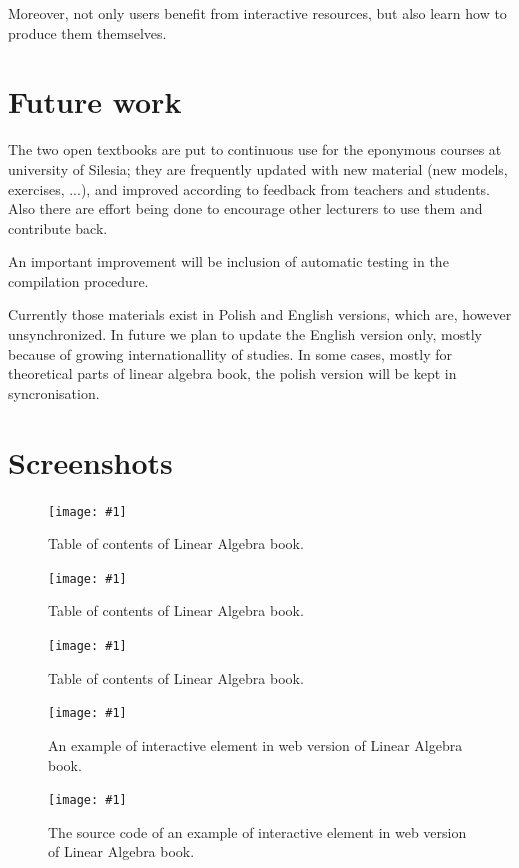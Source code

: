 \documentclass{deliverablereport}
\newcommand{\screenshot}[2]{
\begin{figure}[ht]
  \texttt{[image: \#1]}
  \caption{#2}
  \label{#1}
\end{figure}}
\newcommand{\screenshotsmall}[2]{
\begin{figure}[ht]
  \texttt{[image: \#1]}
  \caption{#2}
  \label{#1}
\end{figure}}
\begin{document}
Moreover, not only users benefit from interactive resources, but also
learn how to produce them themselves.

\section{Future work}


The two open textbooks are put to continuous use for the eponymous
courses at university of Silesia; they are frequently updated with new
material (new models, exercises, ...), and improved according to
feedback from teachers and students. Also there are effort being done
to encourage other lecturers to use them and contribute back.

An important improvement will be inclusion of automatic testing in
the compilation procedure. 

Currently those materials exist in Polish and English versions, which
are, however unsynchronized. In future we plan to update the English
version only, mostly because of growing internationallity of
studies. In some cases, mostly for theoretical parts of linear algebra
book, the polish version will be kept in syncronisation.



\clearpage
\appendix
\section{Screenshots}\label{screenshots}

\screenshot{toc1.png}{Table of contents of Linear Algebra book.}
\screenshot{toc2.png}{Table of contents of Linear Algebra book.}
\screenshot{toc3.png}{Table of contents of Linear Algebra book.}

\screenshot{la_book_ex.png}{An example of interactive element in web
  version of Linear Algebra book.}  \screenshotsmall{rst.png}{The
  source code of an example of interactive element in web version of
  Linear Algebra book.}
\end{document}

